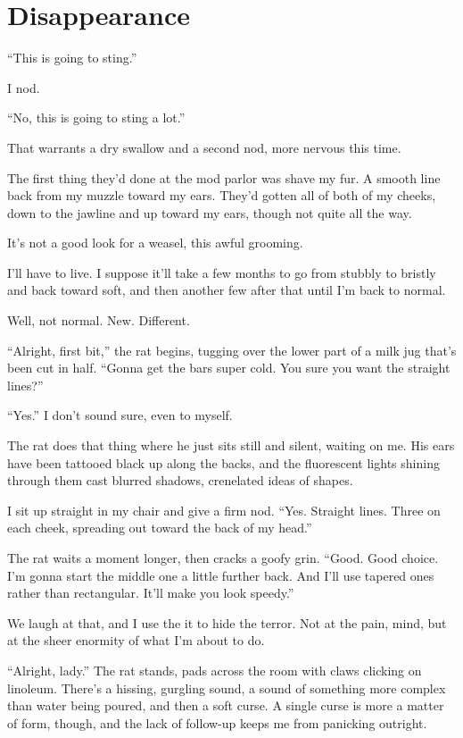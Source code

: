 \hypertarget{disappearance}{%
\chapter{Disappearance}\label{disappearance}}

``This is going to sting.''

I nod.

``No, this is going to sting a lot.''

That warrants a dry swallow and a second nod, more nervous this time.

The first thing they'd done at the mod parlor was shave my fur. A smooth line back from my muzzle toward my ears. They'd gotten all of both of my cheeks, down to the jawline and up toward my ears, though not quite all the way.

It's not a good look for a weasel, this awful grooming.

I'll have to live. I suppose it'll take a few months to go from stubbly to bristly and back toward soft, and then another few after that until I'm back to normal.

Well, not normal. New. Different.

``Alright, first bit,'' the rat begins, tugging over the lower part of a milk jug that's been cut in half. ``Gonna get the bars super cold. You sure you want the straight lines?''

``Yes.'' I don't sound sure, even to myself.

The rat does that thing where he just sits still and silent, waiting on me. His ears have been tattooed black up along the backs, and the fluorescent lights shining through them cast blurred shadows, crenelated ideas of shapes.

I sit up straight in my chair and give a firm nod. ``Yes. Straight lines. Three on each cheek, spreading out toward the back of my head.''

The rat waits a moment longer, then cracks a goofy grin. ``Good. Good choice. I'm gonna start the middle one a little further back. And I'll use tapered ones rather than rectangular. It'll make you look speedy.''

We laugh at that, and I use the it to hide the terror. Not at the pain, mind, but at the sheer enormity of what I'm about to do.

``Alright, lady.'' The rat stands, pads across the room with claws clicking on linoleum. There's a hissing, gurgling sound, a sound of something more complex than water being poured, and then a soft curse. A single curse is more a matter of form, though, and the lack of follow-up keeps me from panicking outright.

